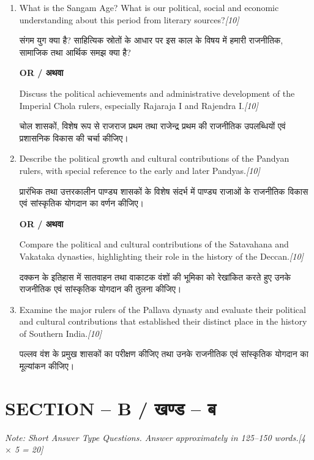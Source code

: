\documentclass[11pt,a4paper]{article}
\newcommand{\pts}[1]{\hfill \textit{[#1]}}
\begin{document}
\begin{enumerate}[label=\textbf{\arabic*.},leftmargin=*,itemsep=12pt]

  \item What is the Sangam Age? What is our political, social and economic understanding about this period from literary sources?\pts{10}
  
  संगम युग क्या है? साहित्यिक स्रोतों के आधार पर इस काल के विषय में हमारी राजनीतिक, सामाजिक तथा आर्थिक समझ क्या है?

  \begin{center}\textbf{OR / अथवा}\end{center}

  Discuss the political achievements and administrative development of the Imperial Chola rulers, especially Rajaraja I and Rajendra I.\pts{10}
  
  चोल शासकों, विशेष रूप से राजराज प्रथम तथा राजेन्द्र प्रथम की राजनीतिक उपलब्धियों एवं प्रशासनिक विकास की चर्चा कीजिए।

  \item Describe the political growth and cultural contributions of the Pandyan rulers, with special reference to the early and later Pandyas.\pts{10}
  
  प्रारंभिक तथा उत्तरकालीन पाण्ड्य शासकों के विशेष संदर्भ में पाण्ड्य राजाओं के राजनीतिक विकास एवं सांस्कृतिक योगदान का वर्णन कीजिए।

  \begin{center}\textbf{OR / अथवा}\end{center}

  Compare the political and cultural contributions of the Satavahana and Vakataka dynasties, highlighting their role in the history of the Deccan.\pts{10}
  
  दक्कन के इतिहास में सातवाहन तथा वाकाटक वंशों की भूमिका को रेखांकित करते हुए उनके राजनीतिक एवं सांस्कृतिक योगदान की तुलना कीजिए।

  \item Examine the major rulers of the Pallava dynasty and evaluate their political and cultural contributions that established their distinct place in the history of Southern India.\pts{10}
  
  पल्लव वंश के प्रमुख शासकों का परीक्षण कीजिए तथा उनके राजनीतिक एवं सांस्कृतिक योगदान का मूल्यांकन कीजिए।

\end{enumerate}

\bigskip

\section*{SECTION -- B / खण्ड -- ब}
\noindent \textit{Note: Short Answer Type Questions. Answer approximately in 125--150 words.}\pts{4 $\times$ 5 = 20}
\end{document}
